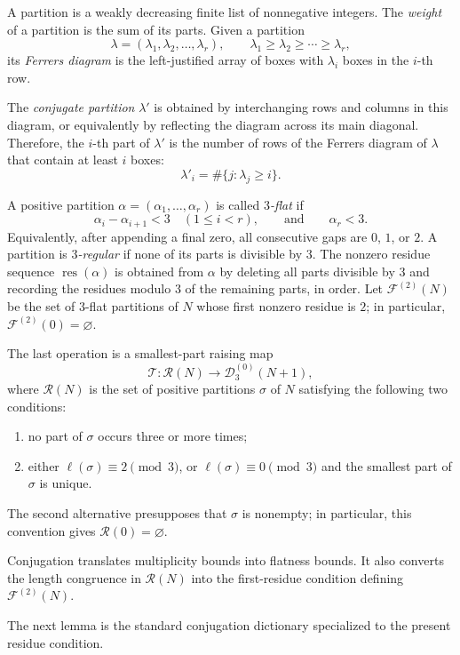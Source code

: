 \documentclass[11pt]{amsart}
\theoremstyle{definition}
\theoremstyle{remark}
\newcommand{\D}{\mathcal D}
\newcommand{\R}{\mathcal R}
\newcommand{\F}{\mathcal F}
\newcommand{\res}{\operatorname{res}}
\begin{document}
A partition is a weakly decreasing finite list of nonnegative integers.  The \emph{weight} of a partition is the sum of its parts. Given a partition
\[
\lambda=(\lambda_1,\lambda_2,\ldots,\lambda_r),
\qquad
\lambda_1\geq \lambda_2\geq \cdots \geq \lambda_r,
\]
its \emph{Ferrers diagram} is the left-justified array of boxes with \(\lambda_i\)
boxes in the \(i\)-th row.

The \emph{conjugate partition} \(\lambda'\) is obtained by interchanging rows and
columns in this diagram, or equivalently by reflecting the diagram across its
main diagonal.  Therefore, the \(i\)-th part of \(\lambda'\) is the number of rows of
the Ferrers diagram of \(\lambda\) that contain at least \(i\) boxes:
\[
\lambda'_i=\#\{j:\lambda_j\ge i\}.
\]

A positive partition $\alpha=(\alpha_1,\ldots,\alpha_r)$ is called \emph{$3$-flat} if
\[
        \alpha_i-\alpha_{i+1}<3\quad(1\le i<r),
        \qquad\text{and}\qquad
        \alpha_r<3.
\]
Equivalently, after appending a final zero, all consecutive gaps are $0$, $1$, or $2$.  A partition is \emph{$3$-regular} if none of its parts is divisible by $3$.  The nonzero residue sequence $\res(\alpha)$ is obtained from $\alpha$ by deleting all parts divisible by $3$ and recording the residues modulo $3$ of the remaining parts, in order.  Let $\F^{(2)}(N)$ be the set of $3$-flat partitions of $N$ whose first nonzero residue is $2$; in particular, $\F^{(2)}(0)=\varnothing$.

The last operation is a smallest-part raising map
\[
        \mathcal T:\R(N)\longrightarrow \D_3^{(0)}(N+1),
\]
where $\R(N)$ is the set of positive partitions $\sigma$ of $N$ satisfying the following two conditions:
\begin{enumerate}[label=(\roman*),leftmargin=2.6em]
\item no part of $\sigma$ occurs three or more times;
\item either $\ell(\sigma)\equiv2\pmod3$, or $\ell(\sigma)\equiv0\pmod3$ and the smallest part of $\sigma$ is unique.
\end{enumerate}
The second alternative presupposes that $\sigma$ is nonempty; in particular, this convention gives $\R(0)=\varnothing$.

Conjugation translates multiplicity bounds into flatness bounds.  It also converts the length congruence in $\R(N)$ into the first-residue condition defining $\F^{(2)}(N)$.

The next lemma is the standard conjugation dictionary specialized to the present residue condition.
\end{document}
